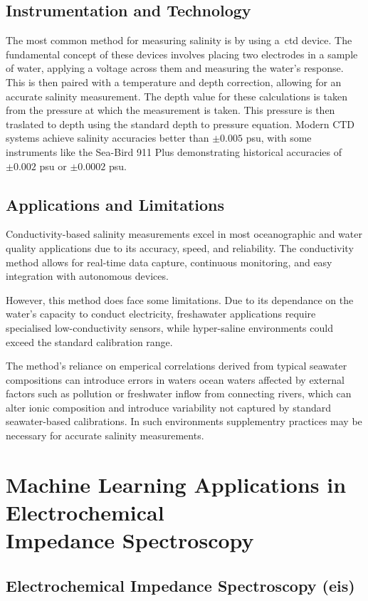 \subsection{Instrumentation and Technology}
The most common method for measuring salinity is by using a~\gls{ctd} device.
The fundamental concept of these devices involves placing two electrodes in a sample of water, applying a voltage across them and measuring the water's response. This is then paired with a temperature and depth correction, allowing for an accurate salinity measurement.
The depth value for these calculations is taken from the pressure at which the measurement is taken.
This pressure is then traslated to depth using the standard depth to pressure equation.
Modern CTD systems achieve salinity accuracies better than $\pm0.005$ \gls{psu}, with some instruments like the Sea-Bird 911 Plus demonstrating historical accuracies of $\pm0.002$ \gls{psu} or $\pm0.0002$ \gls{psu}.

\subsection{Applications and Limitations}
Conductivity-based salinity measurements excel in most oceanographic and water quality applications due to its accuracy, speed, and reliability.
The conductivity method allows for real-time data capture, continuous monitoring, and easy integration with autonomous devices. 

However, this method does face some limitations. Due to its dependance on the water's capacity to conduct electricity, freshawater applications require specialised low-conductivity sensors, while hyper-saline environments could exceed the standard calibration range.

The method's reliance on emperical correlations derived from typical seawater compositions can introduce errors in waters ocean waters affected by external factors such as pollution or freshwater inflow from connecting rivers, which can alter ionic composition and introduce variability not captured by standard seawater-based calibrations.
In such environments supplementry practices may be necessary for accurate salinity measurements.

\section{Machine Learning Applications in Electrochemical \\ Impedance Spectroscopy}
\subsection{Electrochemical Impedance Spectroscopy (\gls{eis})}

